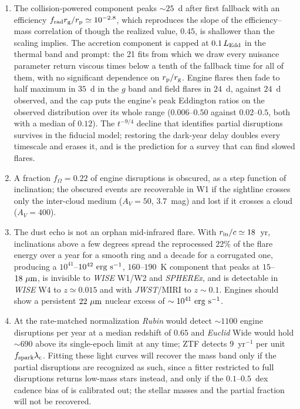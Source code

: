 \documentclass[twocolumn,pdftex]{aastex701}
\newcommand{\fom}{f_{\Omega}\xspace}
\newcommand{\um}{\mu{\rm m}\xspace}
\newcommand{\lsst}{{\it Rubin}\xspace}
\newcommand{\wise}{{\it WISE}\xspace}
\newcommand{\jwst}{{\it JWST}\xspace}
\newcommand{\euclid}{{\it Euclid}\xspace}
\newcommand{\spherex}{{\it SPHEREx}\xspace}
\newcommand{\fspark}{f_{\rm spark}\xspace}
\newcommand{\lamc}{\lambda_{\rm c}\xspace}
\begin{document}
\begin{enumerate}
\item The collision-powered component peaks $\sim 25$~d after first fallback with an efficiency $f_{\rm rad} r_{\rm g}/r_{\rm p} \simeq 10^{-2.8}$, which reproduces the slope of the efficiency--mass correlation of \citet{Nicholl:2022a} though the realized value, $0.45$, is shallower than the scaling implies. The accretion component is capped at $0.1\, L_{\rm Edd}$ in the thermal band and prompt: the 21 fits from which we draw every nuisance parameter return viscous times below a tenth of the fallback time for all of them, with no significant dependence on $r_{\rm p}/r_{\rm g}$. Engine flares then fade to half maximum in $35$~d in the $g$ band and field flares in $24$~d, against $24$~d observed, and the cap puts the engine's peak Eddington ratios on the observed distribution over its whole range ($0.006$--$0.50$ against $0.02$--$0.5$, both with a median of $0.12$). The $t^{-9/4}$ decline that identifies partial disruptions survives in the fiducial model; restoring the dark-year delay doubles every timescale and erases it, and is the prediction for a survey that can find slowed flares.
\item A fraction $\fom = 0.22$ of engine disruptions is obscured, as a step function of inclination; the obscured events are recoverable in W1 if the sightline crosses only the inter-cloud medium ($A_V = 50$, $3.7$~mag) and lost if it crosses a cloud ($A_V = 400$).
\item The dust echo is not an orphan mid-infrared flare. With $r_{\rm in}/c \simeq 18$~yr, inclinations above a few degrees spread the reprocessed $22\%$ of the flare energy over a year for a smooth ring and a decade for a corrugated one, producing a $10^{41}$--$10^{42}~{\rm erg~s^{-1}}$, $160$--$190$~K component that peaks at $15$--$18~\um$, is invisible to \wise W1/W2 and \spherex, and is detectable in \wise W4 to $z \simeq 0.015$ and with \jwst/MIRI to $z \sim 0.1$. Engines should show a persistent $22~\um$ nuclear excess of $\sim 10^{41}~{\rm erg~s^{-1}}$.
\item At the rate-matched normalization \lsst would detect $\sim 1100$ engine disruptions per year at a median redshift of $0.65$ and \euclid Wide would hold $\sim 690$ above its single-epoch limit at any time; ZTF detects $9$~yr$^{-1}$ per unit $\fspark \lamc$. Fitting these light curves will recover the mass band only if the partial disruptions are recognized as such, since a fitter restricted to full disruptions returns low-mass stars instead, and only if the $0.1$--$0.5$~dex cadence bias of \citet{Angus:2026a} is calibrated out; the stellar masses and the partial fraction will not be recovered.
\end{enumerate}
\end{document}
